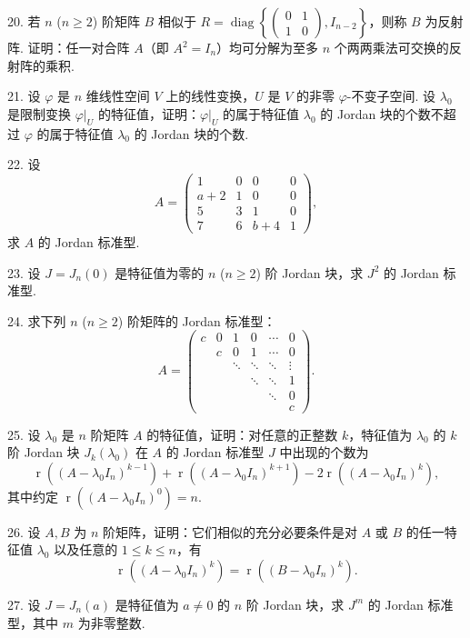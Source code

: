 \documentclass[UTF8,12pt,a4paper,fontset=fandol]{ctexart}
\begin{document}
20. 若 $n$ ($n\geq 2$) 阶矩阵 $B$ 相似于 $R=\operatorname{diag}\left\{\left(\begin{array}{cc}0&1\\1&0\end{array}\right),I_{n-2}\right\}$，则称 $B$ 为反射阵. 证明：任一对合阵 $A$（即 $A^2=I_n$）均可分解为至多 $n$ 个两两乘法可交换的反射阵的乘积.

21. 设 $\varphi$ 是 $n$ 维线性空间 $V$ 上的线性变换，$U$ 是 $V$ 的非零 $\varphi$-不变子空间. 设 $\lambda_0$ 是限制变换 $\varphi|_U$ 的特征值，证明：$\varphi|_U$ 的属于特征值 $\lambda_0$ 的 Jordan 块的个数不超过 $\varphi$ 的属于特征值 $\lambda_0$ 的 Jordan 块的个数.

22. 设
\[
A=\left(\begin{array}{cccc}
1 & 0 & 0 & 0\\
a+2 & 1 & 0 & 0\\
5 & 3 & 1 & 0\\
7 & 6 & b+4 & 1
\end{array}\right),
\]
求 $A$ 的 Jordan 标准型.

23. 设 $J=J_n(0)$ 是特征值为零的 $n$ ($n\geq 2$) 阶 Jordan 块，求 $J^2$ 的 Jordan 标准型.

24. 求下列 $n$ ($n\geq 2$) 阶矩阵的 Jordan 标准型：
\[
A=\left(\begin{array}{cccccc}
c & 0 & 1 & 0 & \cdots & 0\\
& c & 0 & 1 & \cdots & 0\\
& & \ddots & \ddots & \ddots & \vdots\\
& & & \ddots & \ddots & 1\\
& & & & \ddots & 0\\
& & & & & c
\end{array}\right).
\]

25. 设 $\lambda_0$ 是 $n$ 阶矩阵 $A$ 的特征值，证明：对任意的正整数 $k$，特征值为 $\lambda_0$ 的 $k$ 阶 Jordan 块 $J_k(\lambda_0)$ 在 $A$ 的 Jordan 标准型 $J$ 中出现的个数为
\[
\operatorname{r}((A-\lambda_0I_n)^{k-1})+\operatorname{r}((A-\lambda_0I_n)^{k+1})-2\operatorname{r}((A-\lambda_0I_n)^k),
\]
其中约定 $\operatorname{r}((A-\lambda_0I_n)^0)=n$.

26. 设 $A,B$ 为 $n$ 阶矩阵，证明：它们相似的充分必要条件是对 $A$ 或 $B$ 的任一特征值 $\lambda_0$ 以及任意的 $1\leq k\leq n$，有
\[
\operatorname{r}((A-\lambda_0I_n)^k)=\operatorname{r}((B-\lambda_0I_n)^k).
\]

27. 设 $J=J_n(a)$ 是特征值为 $a\ne 0$ 的 $n$ 阶 Jordan 块，求 $J^m$ 的 Jordan 标准型，其中 $m$ 为非零整数.
\end{document}
